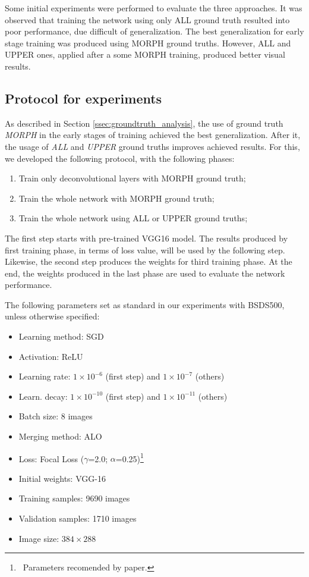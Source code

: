 Some initial experiments were performed to evaluate the three approaches.
It was observed that training the network using only ALL ground truth resulted into poor performance, due difficult of generalization.
The best generalization for early stage training was produced using MORPH ground truths.
However, ALL and UPPER ones, applied after a some MORPH training, produced better visual results.

\subsection{Protocol for experiments}
\label{ssec:framework_experiments}

As described in Section \ref{ssec:groundtruth_analysis}, the use of ground truth \textit{MORPH} in the early stages of training achieved the best generalization.
After it, the usage of \textit{ALL} and \textit{UPPER} ground truths improves achieved results.
For this, we developed the following protocol, with the following phases:

\begin{enumerate}
    \item Train only deconvolutional layers with MORPH ground truth;
    \item Train the whole network with MORPH ground truth;
    \item Train the whole network using ALL or UPPER ground truths;
\end{enumerate}

The first step starts with pre-trained VGG16 model.
The results produced by first training phase, in terms of loss value, will be used by the following step.
Likewise, the second step produces the weights for third training phase.
At the end, the weights produced in the last phase are used to evaluate the network performance.

The following parameters set as standard in our experiments with BSDS500, unless otherwise specified:
\begin{itemize}
    \item Learning method: SGD
    \item Activation: ReLU
    \item Learning rate: $1 \times 10^{-6}$ (first step) and $1 \times 10^{-7}$ (others)
    \item Learn. decay: $1 \times 10^{-10}$ (first step) and $1 \times 10^{-11}$ (others)
    \item Batch size: 8 images
    \item Merging method: ALO
    \item Loss: Focal Loss ($\gamma$=2.0; $\alpha$=0.25)\footnote{~Parameters recomended by  paper.}
    \item Initial weights: VGG-16
    \item Training samples: 9690 images 
    \item Validation samples: 1710 images
    \item Image size: $384 \times 288$
\end{itemize}


